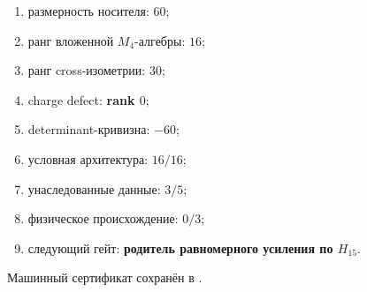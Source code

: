 \begin{protocol}\begin{enumerate}
\item размерность носителя: \textbf{$60$};
\item ранг вложенной $M_4$-алгебры: \textbf{$16$};
\item ранг cross-изометрии: \textbf{$30$};
\item charge defect: \textbf{rank $0$};
\item determinant-кривизна: \textbf{$-60$};
\item условная архитектура: \textbf{$16/16$};
\item унаследованные данные: \textbf{$3/5$};
\item физическое происхождение: \textbf{$0/3$};
\item следующий гейт: \textbf{родитель равномерного усиления по $H_{15}$}.
\end{enumerate}\end{protocol}

Машинный сертификат сохранён в
.